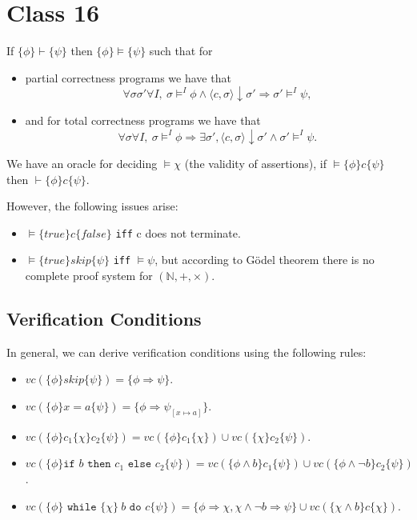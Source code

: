 \chapter{Class 16}
\begin{theorem}[Soundness] If $\{\phi\} \vdash \{\psi\}$ then $\{\phi\} \models\{\psi\}$ such that for 
    \begin{itemize}
        \item partial correctness programs we have that
        \[
            \forall \sigma\sigma'  \forall I, ~ \sigma \models^I \phi \land \langle c,\sigma\rangle\downarrow \sigma' \Rightarrow \sigma' \models^I \psi,  
        \]
        \item and for total correctness programs we have that
        \[
            \forall \sigma \forall I, ~ \sigma \models^I\phi \Rightarrow \exists \sigma', \langle c, \sigma \rangle\downarrow\sigma' \land \sigma'\models^I \psi.    
        \]
    \end{itemize}
\end{theorem}


\begin{theorem} We have an oracle for deciding $\models \chi$ (the validity of assertions), if $\models \{\phi\} c \{\psi\}$ then $\vdash \{\phi\} c \{\psi\}$.
    \label{thm:relative-completeness}
\end{theorem}

However, the following issues arise:
\begin{itemize}
    \item $\models \{true\} c \{false\}$ \texttt{iff} c does not terminate.
    \item $\models \{true\} skip \{\psi\}$ \texttt{iff} $\models \psi$, but according to G\"{o}del theorem there is no complete proof system for $(\mathbb{N}, +, \times)$.
\end{itemize}

\section{Verification Conditions}
In general, we can derive verification conditions using the following rules:
\begin{itemize}
    \item $vc(\{\phi\} skip \{\psi\}) = \{\phi \Rightarrow \psi\}$.
    \item $vc(\{\phi\} x=a \{\psi\}) = \{\phi \Rightarrow \psi_{[x \mapsto a]}\}$.
    \item $vc(\{\phi\} c_1 \{\chi\} c_2 \{\psi\}) = vc(\{\phi\} c_1 \{\chi\}) \cup vc(\{\chi\} c_2 \{\psi\})$.
    \item $vc(\{\phi\} \texttt{if }b \texttt{ then } c_1 \texttt{ else }c_2 \{\psi\}) = vc(\{\phi\land b\} c_1 \{\psi\}) \cup vc(\{\phi \land \neg b\} c_2 \{\psi\})$.
    \item $vc(\{\phi\} \texttt{ while } \{\chi\} ~b \texttt{ do } c \{\psi\}) = \{\phi \Rightarrow \chi, \chi \land \neg b \Rightarrow \psi\} \cup vc(\{\chi \land b\} c \{\chi\})$.
\end{itemize}
